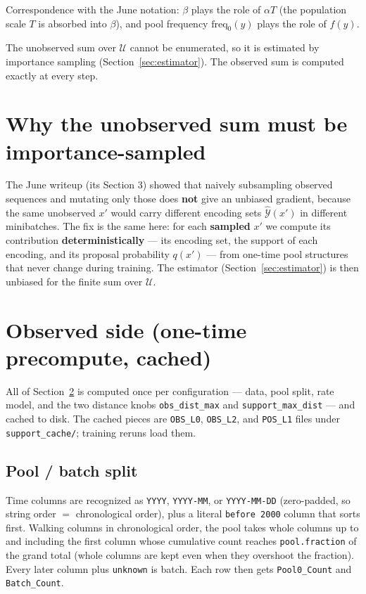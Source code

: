 \documentclass[11pt]{article}
\begin{document}
Correspondence with the June notation: $\beta$ plays the role of
$\alpha T$ (the population scale $T$ is absorbed into $\beta$), and pool
frequency $\text{freq}_0(y)$ plays the role of $f(y)$.

The unobserved sum over $\mathcal{U}$ cannot be enumerated, so it is
estimated by importance sampling (Section~\ref{sec:estimator}). The
observed sum is computed exactly at every step.

\section{Why the unobserved sum must be importance-sampled}\label{sec:why}

The June writeup (its Section 3) showed that naively subsampling observed
sequences and mutating only those does \textbf{not} give an unbiased
gradient, because the same unobserved $x'$ would carry different encoding
sets $\hat{\mathcal{Y}}(x')$ in different minibatches. The fix is the same
here: for each \textbf{sampled} $x'$ we compute its contribution
\textbf{deterministically} --- its encoding set, the support of each
encoding, and its proposal probability $q(x')$ --- from one-time pool
structures that never change during training. The estimator
(Section~\ref{sec:estimator}) is then unbiased for the finite sum over
$\mathcal{U}$.

\section{Observed side (one-time precompute, cached)}\label{sec:observed}

All of Section~\ref{sec:observed} is computed once per configuration
--- data, pool split, rate model, and the two distance knobs
\texttt{obs\_dist\_max} and \texttt{support\_max\_dist} --- and cached to
disk. The cached pieces are \texttt{OBS\_L0}, \texttt{OBS\_L2}, and
\texttt{POS\_L1} files under \texttt{support\_cache/}; training reruns
load them.

\subsection{Pool / batch split}\label{sec:split}

Time columns are recognized as \texttt{YYYY}, \texttt{YYYY-MM}, or
\texttt{YYYY-MM-DD} (zero-padded, so string order $=$ chronological
order), plus a literal \texttt{before 2000} column that sorts first.
Walking columns in chronological order, the pool takes whole columns up to
and including the first column whose cumulative count reaches
\texttt{pool.fraction} of the grand total (whole columns are kept even
when they overshoot the fraction). Every later column plus
\texttt{unknown} is batch. Each row then gets \texttt{Pool0\_Count} and
\texttt{Batch\_Count}.
\end{document}
